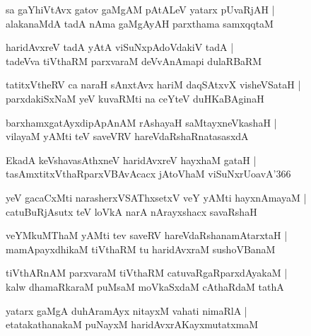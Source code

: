 \documentclass[twoside,12pt,openright]{book}
\newcounter{shloka}[chapter]
\begin{document}
\begin{shloka}%
sa gaYhiVtAvx gatov gaMgAM pAtALeV yatarx pUvaRjAH |\\
alakanaMdA tadA nAma gaMgAyAH parxthama samxqqtaM 
\end{shloka}

\begin{shloka}%
haridAvxreV tadA yAtA viSuNxpAdoVdakiV tadA |\\
tadeVva tiVthaRM parxvaraM deVvAnAmapi dulaRBaRM 
\end{shloka}

\begin{shloka}%
tatitxVtheRV ca naraH sAnxtAvx hariM daqSAtxvX visheVSataH |\\
parxdakiSxNaM yeV kuvaRMti na ceYteV duHKaBAginaH 
\end{shloka}

\begin{shloka}%
barxhamxgatAyxdipApAnAM rAshayaH saMtayxneVkashaH |\\
vilayaM yAMti teV saveVRV hareVdaRshaRnatasasxdA 
\end{shloka}

\begin{shloka}%
EkadA keVshavasAthxneV haridAvxreV hayxhaM gataH |\\
tasAmxtitxVthaRparxVBAvAcacx jAtoVhaM viSuNxrUoavA\char'366 
\end{shloka}

\begin{shloka}%
yeV gacaCxMti narasherxVSAThxsetxV veY yAMti hayxnAmayaM |\\
catuBuRjAsutx teV loVkA narA nArayxshacx savaRshaH 
\end{shloka}

\begin{shloka}%
veYMkuMThaM yAMti tev saveRV hareVdaRshanamAtarxtaH |\\
mamApayxdhikaM tiVthaRM tu haridAvxraM sushoVBanaM 
\end{shloka}

\begin{shloka}%
tiVthARnAM parxvaraM tiVthaRM catuvaRgaRparxdAyakaM |\\
kalw dhamaRkaraM puMsaM moVkaSxdaM cAthaRdaM tathA 
\end{shloka}

\begin{shloka}%
yatarx gaMgA duhAramAyx nitayxM vahati nimaRlA |\\
etatakathanakaM puNayxM haridAvxrAKayxmutatxmaM 
\end{shloka}
\end{document}
